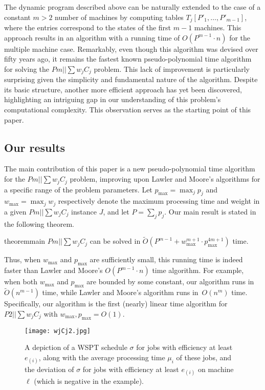 \documentclass[11pt]{llncs}
\begin{document}
The dynamic program described above can be naturally extended to the case of a constant $m > 2$  number of machines by computing tables $T_j[P'_1,\ldots,P'_{m-1}]$, where the entries correspond to the states of the first $m-1$ machines. This approach results in an algorithm with a running time of $O(P^{m-1} \cdot n)$ for the multiple machine case. Remarkably, even though this algorithm was devised over fifty years ago, it remains the fastest known pseudo-polynomial time algorithm for solving the $Pm||\sum w_jC_j$ problem. This lack of improvement is particularly surprising given the simplicity and fundamental nature of the algorithm. Despite its basic structure, another more efficient approach has yet been discovered, highlighting an intriguing gap in our understanding of this problem's computational complexity. This observation serves as the starting point of this paper.






\subsection{Our results}
The main contribution of this paper is a new pseudo-polynomial time algorithm for the $Pm||\sum w_j C_j$ problem, improving upon Lawler and Moore’s algorithms for a specific range of the problem parameters. Let $p_{\max} = \max_j p_j$ and $w_{\max} = \max_j w_j$ respectively denote the maximum processing time and weight in a given $Pm||\sum w_j C_j$ instance $J$, and let $P= \sum_j p_j$. Our main result is stated in the following theorem.
\begin{restatable}{theorem}{main}
\label{thm:main}%
$Pm||\sum w_jC_j$ can be solved in $\widetilde{O}(P^{m-1} + w_{\max}^{m+1} \cdot p_{\max}^{4m+1})$ time.
\end{restatable}
\noindent Thus, when $w_{\max}$ and $p_{\max}$ are sufficiently small, this running time is indeed faster than Lawler and Moore's $O(P^{m-1} \cdot n)$ time algorithm. For example, when both $w_{\max}$ and $p_{\max}$ are bounded by some constant, our algorithm runs in $\widetilde{O}(n^{m-1})$ time, while Lawler and Moore's algorithm runs in~$O(n^m)$ time. Specifically, our algorithm is the first (nearly) linear time algorithm for $P2||\sum w_jC_j$ with $w_{\max},p_{\max}=O(1)$.

\begin{figure}[ht!]
\centering
\texttt{[image: wjCj2.jpg]}
\caption{A depiction of a WSPT schedule $\sigma$ for jobs with efficiency at least $e_{(i)}$, along with the average processing time $\mu_i$ of these jobs, and the deviation of $\sigma$ for jobs with efficiency at least $e_{(i)}$ on machine $\ell$ (which is negative in the example). 
\label{fig:wjCj}}%
\end{figure}
\end{document}
